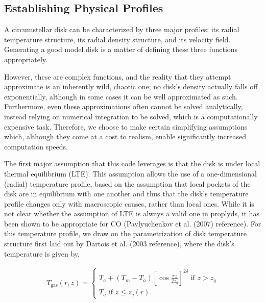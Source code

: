

\subsection{Establishing Physical Profiles}
A circumstellar disk can be characterized by three major profiles: its radial temperature structure, its radial density structure, and its velocity field. Generating a good model disk is a matter of defining these three functions appropriately.

However, these are complex functions, and the reality that they attempt approximate is an inherently wild, chaotic one; no disk's density actually falls off exponentially, although in some cases it can be well approximated as such. Furthermore, even these approximations often cannot be solved analytically, instead relying on numerical integration to be solved, which is a computationally expensive task. Therefore, we choose to make certain simplifying assumptions which, although they come at a cost to realism, enable significantly increased computation speeds.

The first major assumption that this code leverages is that the disk is under local thermal equilibrium (LTE). This assumption allows the use of a one-dimensional (radial) temperature profile, based on the assumption that local pockets of the disk are in equilibrium with one another and thus that the disk's temperature profile changes only with macroscopic causes, rather than local ones. While it is not clear whether the assumption of LTE is always a valid one in proplyds, it has been shown to be appropriate for CO (Pavlyuchenkov et al. (2007) reference). For this temperature profile, we draw on the parametrization of disk temperature structure first laid out by Dartois et al. (2003 reference), where the disk's temperature is given by,

\begin{align}
  T_{\text{gas}}(r, z) = \begin{cases}
                          T_a + (T_m - T_a) \left[ \cos \frac{\pi z}{2 z_q} \right]^{2\delta} \text{   if } z > z_q \\
                          T_a \text{   if } z \leq z_q(r).
                         \end{cases}
\end{align}

